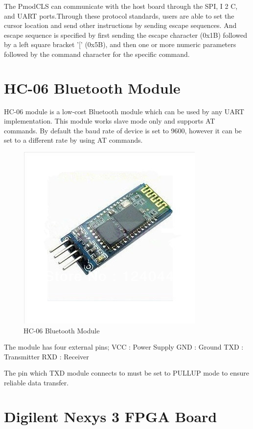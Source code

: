 The PmodCLS can communicate with the host board through the SPI, I 2 C, and UART ports.Through these protocol standards, users are able to set the cursor location and send other instructions by sending
escape sequences. And escape sequence is specified by first sending the escape character (0x1B) followed by a left square bracket '[' (0x5B), and then one or more numeric parameters followed by the command character for the specific command.

\section{HC-06 Bluetooth Module}

HC-06 module is a low-cost Bluetooth module which can be used by any UART implementation. This module works slave mode only and supports AT commands. By default the baud rate of device is set to 9600, however it can be set to a different rate by using AT commands.

\begin{figure}
	\centering
	\includegraphics[scale= 0.6]{images/hc-06.jpg}
	\caption{HC-06 Bluetooth Module}
\end{figure}

The module has four external pins; 
VCC : Power Supply
GND : Ground
TXD : Transmitter
RXD : Receiver   

The pin which TXD module connects to must be set to PULLUP mode to ensure reliable data transfer. 


\section{Digilent Nexys 3 FPGA Board}

